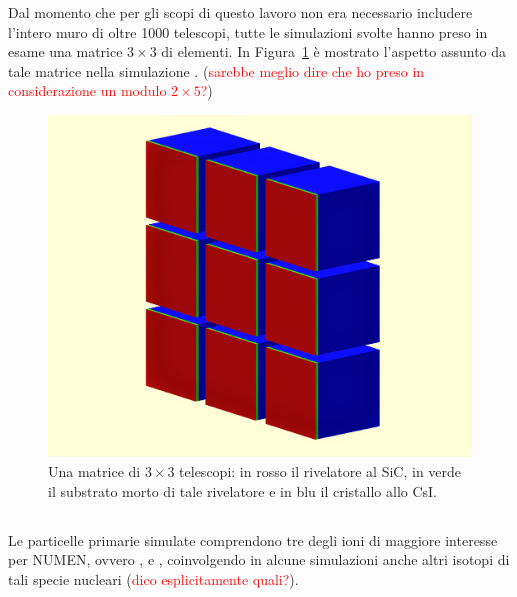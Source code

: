 Dal momento che per gli scopi di questo lavoro non era necessario includere l'intero muro di oltre 1000 telescopi, tutte le simulazioni svolte hanno preso in esame una matrice $3 \times 3$ di elementi.
In Figura~\ref{fig:simulazione_muro} è mostrato l'aspetto assunto da tale matrice nella simulazione \geant. (\textcolor{red}{sarebbe meglio dire che ho preso in considerazione un modulo $2 \times 5$?})

\begin{figure} [!p]
	\centering
	\includegraphics[width=\textwidth, keepaspectratio]{Grafici/wall11_ritagliato_schiarito.png}
	\caption{Una matrice di $3 \times 3$ telescopi: in rosso il rivelatore al SiC, in verde il substrato morto di tale rivelatore e in blu il cristallo allo CsI.} \label{fig:simulazione_muro}
\end{figure}


\subsection{}

Le particelle primarie simulate comprendono tre degli ioni di maggiore interesse per NUMEN, ovvero ,  e , coinvolgendo in alcune simulazioni anche altri isotopi di tali specie nucleari (\textcolor{red}{dico esplicitamente quali?}).


